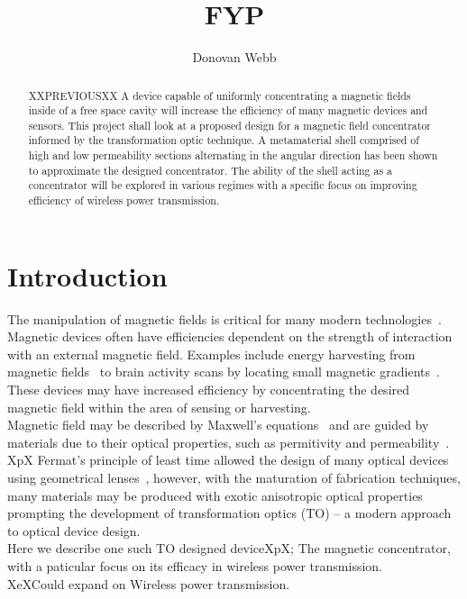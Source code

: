 \documentclass[11pt]{iopart}
\begin{document}
\title[]{FYP}

\author{Donovan Webb}

\address{Department of Physics,
University of Bath, Bath BA2 7AY, United Kingdom}

\begin{abstract}

XXPREVIOUSXX
A device capable of uniformly concentrating a magnetic fields inside of
a free space cavity will increase the efficiency of many magnetic
devices and sensors.  This project shall look at a proposed design for
a magnetic field concentrator informed by the transformation optic
technique. A metamaterial shell comprised of high and low permeability
sections alternating in the angular direction has been shown to
approximate the designed concentrator\cite{N2014}. The ability of the shell acting
as a concentrator will be explored in various regimes with a specific
focus on improving efficiency of wireless power transmission.

\end{abstract}
\section{Introduction}

The manipulation of magnetic fields is critical for many modern
technologies~\cite{REVIEW_MAGNETISM}. Magnetic devices often have
efficiencies dependent on the strength of interaction with an external
magnetic field. Examples include energy harvesting from magnetic
fields~\cite{HARVESTING} to brain activity scans by locating small
magnetic gradients~\cite{BRAIN}. These devices may have increased
efficiency by concentrating the desired magnetic field within the area
of sensing or harvesting. \\
Magnetic field may be described by Maxwell's equations~\cite{MAXWELL}
and are guided by materials due to their optical properties, such as
permitivity and permeability~\cite{OPTICAL PROPERITES}. XpX Fermat's
principle of least time allowed the design of many optical devices
using geometrical lenses~\cite{FERMAT}, however, with the maturation
of fabrication techniques, many materials may be produced with exotic
anisotropic optical properties~\cite{META} prompting the development
of transformation optics (TO) -- a modern approach to optical device
design.\\
Here we describe one such TO designed deviceXpX; The magnetic
concentrator, with a paticular focus on its efficacy in wireless power
transmission. \\
XeXCould expand on Wireless power transmission.
\end{document}
